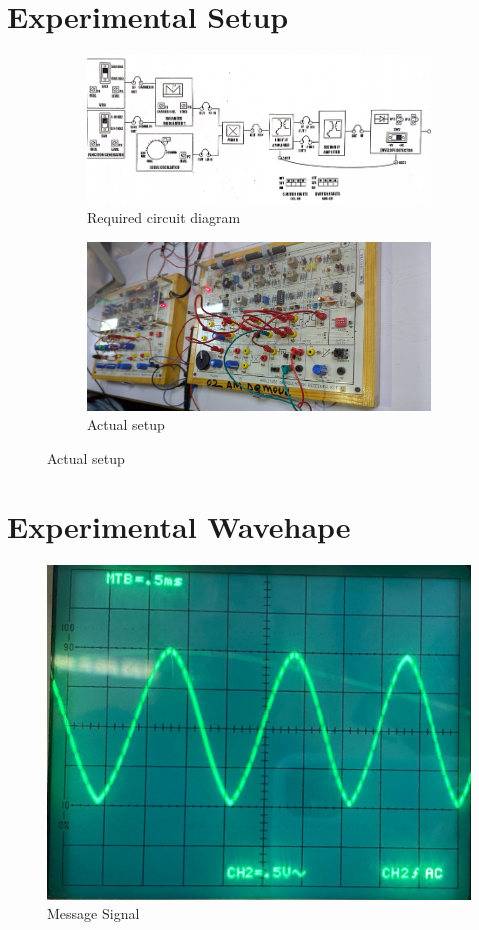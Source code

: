 \documentclass[a4paper,12pt]{article}
\begin{document}
\newpage
	\section{Experimental Setup}
\begin{figure}[H]
	\centering
	\begin{subfigure}[t]{1\textwidth}
		\centering
		\includegraphics[width=1\linewidth]{Images/7}
		\caption{ Required circuit diagram }
		\vspace{2cm}
	\end{subfigure}
	
	\begin{subfigure}[t]{1\textwidth}
		\centering
		\includegraphics[width=0.95\linewidth]{Images/01}
		\caption{ Actual setup}
	\end{subfigure}
\end{figure}
\newpage
\section{Experimental Wavehape}
	\begin{figure}[H]
	\centering
	\includegraphics[width=.65\linewidth, height=0.26\textheight]{"Images/1"}
	\caption{Message Signal}
    \end{figure}
    
\end{document}
